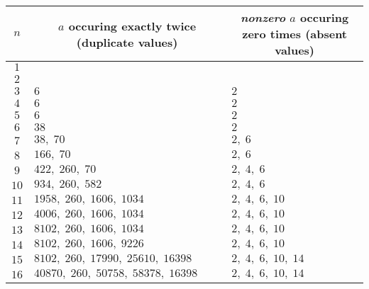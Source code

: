 \documentclass[1gpt]{article}
\theoremstyle{break}
\theoremstyle{nonumberbreak}
\begin{document}
\begin{itemize}
        \begin{table}[h]
            \centering
            \begin{tabular}{|c|l|l|}
                \hline
                \multicolumn{1}{|c|}{$n$} & \multicolumn{1}{|c|}{$a$ occuring exactly twice (duplicate values)} & \multicolumn{1}{|c|}{\emph{nonzero} $a$ occuring zero times (absent values)} \\
                \hline
                $1$  &                                                       & \\
                $2$  &                                                       & \\
                $3$  & $6$                                                   & $2$ \\
                $4$  & $6$                                                   & $2$ \\
                $5$  & $6$                                                   & $2$ \\
                $6$  & $38$                                                  & $2$ \\
                $7$  & $38,\; 70$                                              & $2,\; 6$ \\
                $8$  & $166,\; 70$                                             & $2,\; 6$ \\
                $9$  & $422,\; 260,\; 70$                                        & $2,\; 4,\; 6$ \\
                $10$ & $934,\; 260,\; 582$                                       & $2,\; 4,\; 6$ \\
                $11$ & $1958,\; 260,\; 1606,\; 1034$                               & $2,\; 4,\; 6,\; 10$ \\
                $12$ & $4006,\; 260,\; 1606,\; 1034$                               & $2,\; 4,\; 6,\; 10$ \\
                $13$ & $8102,\; 260,\; 1606,\; 1034$                               & $2,\; 4,\; 6,\; 10$ \\
                $14$ & $8102,\; 260,\; 1606,\; 9226$                               & $2,\; 4,\; 6,\; 10$ \\
                $15$ & $8102,\; 260,\; 17990,\; 25610,\; 16398$                      & $2,\; 4,\; 6,\; 10,\; 14$ \\
                $16$ & $40870,\; 260,\; 50758,\; 58378,\; 16398$                     & $2,\; 4,\; 6,\; 10,\; 14$ \\
                \hline
            \end{tabular}
        \end{table}


\end{itemize}
\end{document}
